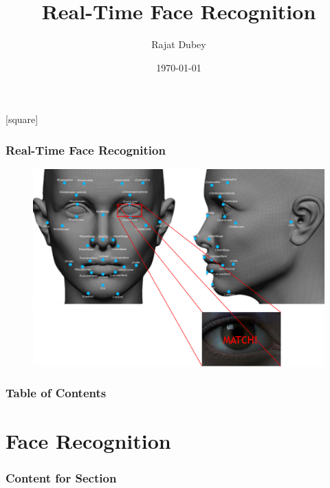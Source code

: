 \documentclass[xcolor=dvipsnames]{beamer}
\begin{document}
    \title[Real-Time Face Recognition]{Real-Time Face Recognition}
    \author[Rajat Dubey]{Rajat Dubey}
    \date{\today}
    \begin{frame}
        \titlepage
    \end{frame}
    [square]
    
    \begin{frame}
    \frametitle{Real-Time Face Recognition}
    \begin{figure}[H]
    \graphicspath{{figs/}}
    \includegraphics[width=1.0\textwidth]{Facial.png}
    \caption{}
    \end{figure}
    \end{frame}
    
    \begin{frame}
        \frametitle{Table of Contents}
        \tableofcontents
    \end{frame}

    \section{Face Recognition}
    \begin{frame}
      \frametitle{Content for Section \thesection}
      \tableofcontents[currentsection]
    \end{frame}
\end{document}
